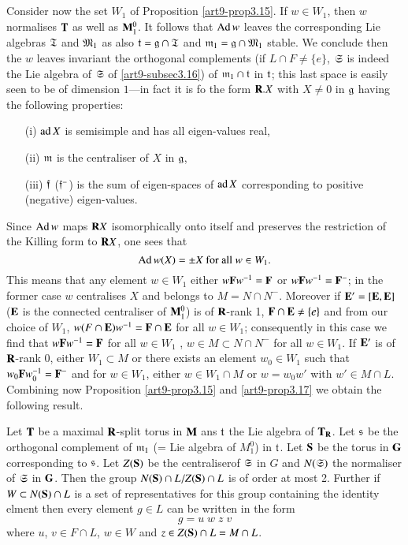 \subsection{}\label{ref-subsec3.18}
Consider now the set $W_1$ of Proposition \ref{art9-prop3.15}. If $w \in W_1$, then $w$ normalises $\mathbf{T}$ as well as $\mathbf{M}^0_1$. It follows that $\operatorname{Ad} w$ leaves the corresponding Lie algebras $\mathfrak{T}$ and $\mathfrak{M}_1$ as also $\mathfrak{t} =\mathfrak{g} \cap \mathfrak{T}$ and $\mathfrak{m}_1 = \mathfrak{g} \cap \mathfrak{M}_1$ stable. We conclude then the $w$ leaves invariant the orthogonal complements (if $L \cap  F \neq \{e\}$, $\mathfrak{S}$ is indeed the Lie algebra of $\mathfrak{S}$ of  \ref{art9-subsec3.16}) of $\mathfrak{m}_1 \cap \mathfrak{t}$  in $\mathfrak{t}$; this last space is easily seen to be of dimension $1$---in  fact it is fo the  form $\mathbf{R}.X$ with $X \neq 0$ in $\mathfrak{g}$ having the following properties:
\begin{itemize}
\item[(i)] $\operatorname{ad} X$ is semisimple and has all eigen-values real,

\item[(ii)] $\mathfrak{m}$ is the centraliser of $X$ in $\mathfrak{g}$,

\item[(iii)] $\mathfrak{f}$ (\resp $\mathfrak{f}^-$) is the sum of eigen-spaces of $\operatorname{ad} X$ corresponding to positive (\resp negative) eigen-values.
\end{itemize}
Since $\operatorname{Ad} w$ maps $\mathbf{R} X$ isomorphically onto itself and preserves the restriction of the Killing form to $\mathbf{R} X$, one sees that 
$$
\operatorname{Ad} w (X) = \pm X \text{ for all } w \in W_1.
$$
This means that any element $w \in W_1$ either $w \mathbf{F} w^{-1} = \mathbf{F}$ or $w \mathbf{F} w^{-1} = \mathbf{F}^-$; in the former case $w$ centralises $X$ and belongs to $M = N \cap N^-$. Moreover if $\mathbf{E}' = [\mathbf{E},\mathbf{E}]$ ($\mathbf{E}$ is the connected centraliser of $\mathbf{M}^0_1$) is of $\mathbf{R}$-rank 1, $\mathbf{F} \cap \mathbf{E} \neq \{e\}$ and from our choice of $W_1$, $w (F \cap \mathbf{E}) w^{-1} = \mathbf{F} \cap \mathbf{E}$ for all $w \in W_1$; consequently in this case we find that $w \mathbf{F} w^{-1} = \mathbf{F}$ for all $w \in W_1$ \ie, $w \in M \subset N \cap N^-$ for all $w \in W_1$. If $\mathbf{E}'$ is of $\mathbf{R}$-rank 0, either $W_1 \subset M$ or there exists an element $w_0 \in W_1$ such that $w_0 \mathbf{F} w_0^{-1}=\mathbf{F}^-$ and for $w \in W_1$, either $w \in W_1 \cap M$ or $w = w_0 w'$ with $w' \in M \cap L$. Combining now Proposition \ref{art9-prop3.15}  and \ref{art9-prop3.17} we obtain the following result.

\setcounter{definition}{18}
\begin{proposition}\label{art9-prop3.19}
Let $\mathbf{T}$ be a maximal $\mathbf{R}$-split torus in $\mathbf{M}$ ans $\mathfrak{t}$ the Lie algebra of $\mathbf{T}_{\mathbf{R}}$. Let $\mathfrak{s}$ be the orthogonal complement of $\mathfrak{m}_1$ (= Lie algebra of $M^0_1$) in $\mathfrak{t}$. Let $\mathbf{S}$ be the torus in $\mathbf{G}$ corresponding to $\mathfrak{s}$. Let $Z (\mathbf{S})$ be the centraliser\pageoriginale  of $\mathfrak{S}$ in $G$ and $N(\mathfrak{S})$ the normaliser of $\mathfrak{S}$ in $\mathbf{G}$. Then the group $N (\mathbf{S}) \cap L / Z(\mathbf{S}) \cap L$ is of order at most 2. Further if $W \subset N (\mathbf{S}) \cap L$ is a set of representatives for this group containing the identity elment then every element $g \in L$ can be written in the form 
$$
g = u \;w \;z \;v
$$
where $u$, $v \in F \cap L$, $w \in W$ and $z \in Z (\mathbf{S}) \cap L = M \cap L$.
\end{proposition} 

